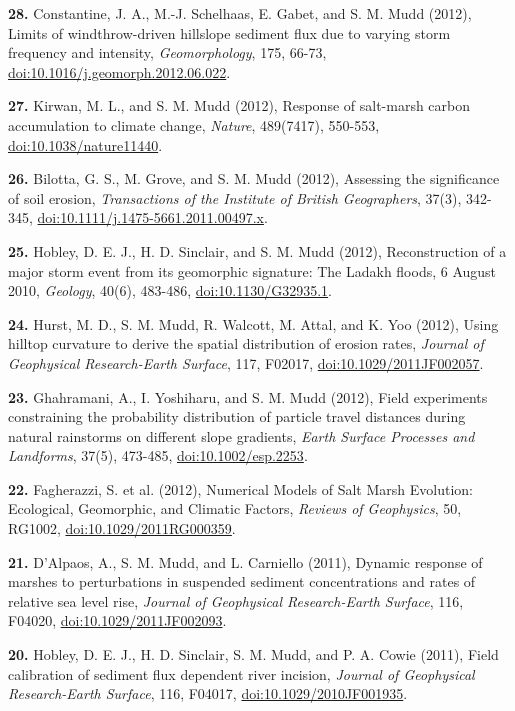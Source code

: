\documentclass[10pt, a4paper]{article}
\newcommand{\years}[1]{\marginnote{\scriptsize #1}}
\begin{document}
\years{2012}\hangindent=0.7cm\textbf{28.} Constantine, J. A., M.-J. Schelhaas, E. Gabet, and S. M. Mudd (2012), Limits of windthrow-driven hillslope sediment flux due to varying storm frequency and intensity, \textit{Geomorphology}, 175, 66-73, \href{http://dx.doi.org/doi:10.1016/j.geomorph.2012.06.022}{doi:10.1016/j.geomorph.2012.06.022}.\par
\hangindent=0.7cm\textbf{27.} Kirwan, M. L., and S. M. Mudd (2012), Response of salt-marsh carbon accumulation to climate change, \textit{Nature}, 489(7417), 550-553, \href{http://dx.doi.org/doi:10.1038/nature11440}{doi:10.1038/nature11440}.\par
\hangindent=0.7cm\textbf{26.} Bilotta, G. S., M. Grove, and S. M. Mudd (2012), Assessing the significance of soil erosion, \textit{Transactions of the Institute of British Geographers}, 37(3), 342-345, \href{http://dx.doi.org/doi:10.1111/j.1475-5661.2011.00497.x}{doi:10.1111/j.1475-5661.2011.00497.x}.\par
\hangindent=0.7cm\textbf{25.} Hobley, D. E. J., H. D. Sinclair, and S. M. Mudd (2012), Reconstruction of a major storm event from its geomorphic signature: The Ladakh floods, 6 August 2010, \textit{Geology}, 40(6), 483-486, \href{http://dx.doi.org/doi:10.1130/G32935.1}{doi:10.1130/G32935.1}.\par
\hangindent=0.7cm\textbf{24.} Hurst, M. D., S. M. Mudd, R. Walcott, M. Attal, and K. Yoo (2012), Using hilltop curvature to derive the spatial distribution of erosion rates, \textit{Journal of Geophysical Research-Earth Surface}, 117, F02017, \href{http://dx.doi.org/doi:10.1029/2011JF002057}{doi:10.1029/2011JF002057}.\par
\hangindent=0.7cm\textbf{23.} Ghahramani, A., I. Yoshiharu, and S. M. Mudd (2012), Field experiments constraining the probability distribution of particle travel distances during natural rainstorms on different slope gradients, \textit{Earth Surface Processes and Landforms}, 37(5), 473-485, \href{http://dx.doi.org/doi:10.1002/esp.2253}{doi:10.1002/esp.2253}.\par
\hangindent=0.7cm\textbf{22.} Fagherazzi, S. et al. (2012), Numerical Models of Salt Marsh Evolution: Ecological, Geomorphic, and Climatic Factors, \textit{Reviews of Geophysics}, 50, RG1002, \href{http://dx.doi.org/doi:10.1029/2011RG000359}{doi:10.1029/2011RG000359}.\par

\years{2011}\hangindent=0.7cm\textbf{21.} D'Alpaos, A., S. M. Mudd, and L. Carniello (2011), Dynamic response of marshes to perturbations in suspended sediment concentrations and rates of relative sea level rise, \textit{Journal of Geophysical Research-Earth Surface}, 116, F04020, \href{http://dx.doi.org/doi:10.1029/2011JF002093}{doi:10.1029/2011JF002093}.\par
\hangindent=0.7cm\textbf{20.} Hobley, D. E. J., H. D. Sinclair, S. M. Mudd, and P. A. Cowie (2011), Field calibration of sediment flux dependent river incision, \textit{Journal of Geophysical Research-Earth Surface}, 116, F04017, \href{http://dx.doi.org/doi:10.1029/2010JF001935}{doi:10.1029/2010JF001935}.\par
\end{document}

